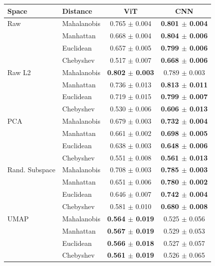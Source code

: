 \begin{tabular}{llcc}
\toprule
Space & Distance & ViT & CNN \\
\midrule
Raw & Mahalanobis & 0.765 $\pm$ 0.004 & \textbf{0.801 $\pm$ 0.004} \\
 & Manhattan & 0.668 $\pm$ 0.004 & \textbf{0.804 $\pm$ 0.006} \\
 & Euclidean & 0.657 $\pm$ 0.005 & \textbf{0.799 $\pm$ 0.006} \\
 & Chebyshev & 0.517 $\pm$ 0.007 & \textbf{0.668 $\pm$ 0.006} \\
\midrule
Raw L2 & Mahalanobis & \textbf{0.802 $\pm$ 0.003} & 0.789 $\pm$ 0.003 \\
 & Manhattan & 0.736 $\pm$ 0.013 & \textbf{0.813 $\pm$ 0.011} \\
 & Euclidean & 0.719 $\pm$ 0.015 & \textbf{0.799 $\pm$ 0.007} \\
 & Chebyshev & 0.530 $\pm$ 0.006 & \textbf{0.606 $\pm$ 0.013} \\
\midrule
PCA & Mahalanobis & 0.679 $\pm$ 0.003 & \textbf{0.732 $\pm$ 0.004} \\
 & Manhattan & 0.661 $\pm$ 0.002 & \textbf{0.698 $\pm$ 0.005} \\
 & Euclidean & 0.638 $\pm$ 0.003 & \textbf{0.648 $\pm$ 0.006} \\
 & Chebyshev & 0.551 $\pm$ 0.008 & \textbf{0.561 $\pm$ 0.013} \\
\midrule
Rand. Subspace & Mahalanobis & 0.708 $\pm$ 0.003 & \textbf{0.785 $\pm$ 0.003} \\
 & Manhattan & 0.651 $\pm$ 0.006 & \textbf{0.780 $\pm$ 0.002} \\
 & Euclidean & 0.646 $\pm$ 0.007 & \textbf{0.742 $\pm$ 0.004} \\
 & Chebyshev & 0.581 $\pm$ 0.010 & \textbf{0.680 $\pm$ 0.008} \\
\midrule
UMAP & Mahalanobis & \textbf{0.564 $\pm$ 0.019} & 0.525 $\pm$ 0.056 \\
 & Manhattan & \textbf{0.567 $\pm$ 0.019} & 0.529 $\pm$ 0.053 \\
 & Euclidean & \textbf{0.566 $\pm$ 0.018} & 0.527 $\pm$ 0.057 \\
 & Chebyshev & \textbf{0.561 $\pm$ 0.019} & 0.526 $\pm$ 0.065 \\

\bottomrule
\end{tabular}